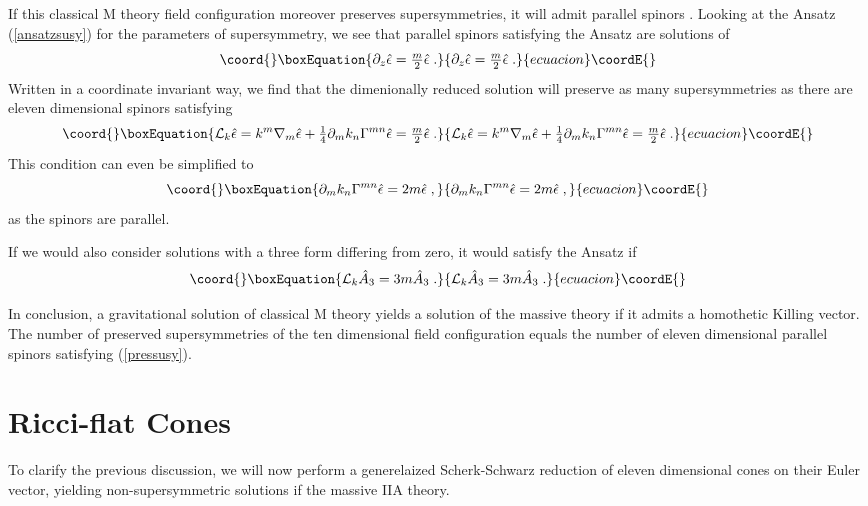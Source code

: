 \documentclass[a4paper,12pt]{article}
\providecommand{\ft}[2]{{\textstyle\frac{#1}{#2}}}
\begin{document}
If this classical M theory field configuration moreover preserves \coordHE{} supersymmetries, it will admit \coordHE{} parallel spinors \myHighlight{$\hat{\epsilon}$}\coordHE{}. Looking at the Ansatz (\ref{ansatzsusy}) for the parameters of supersymmetry, we see that parallel spinors satisfying the Ansatz are solutions of
\begin{equation}\coord{}\boxEquation{
\partial_z \hat{\epsilon}=\ft m2 \hat{\epsilon}\; .
}{
\partial_z \hat{\epsilon}=\ft m2 \hat{\epsilon}\; .
}{ecuacion}\coordE{}\end{equation}
Written in a coordinate invariant way, we find that the dimenionally reduced solution will preserve as many supersymmetries as there are eleven dimensional spinors satisfying
\begin{equation}\coord{}\boxEquation{
\mathcal{L}_k \hat{\epsilon}=k^m \nabla_m \hat{\epsilon}+\ft14 \partial_m k_n \Gamma^{mn} \hat{\epsilon}=\ft m2 \hat{\epsilon} \; .
}{
\mathcal{L}_k \hat{\epsilon}=k^m \nabla_m \hat{\epsilon}+\ft14 \partial_m k_n \Gamma^{mn} \hat{\epsilon}=\ft m2 \hat{\epsilon} \; .
}{ecuacion}\coordE{}\end{equation}
This condition can even be simplified to
\begin{equation}\coord{}\boxEquation{\label{pressusy}
\partial_m k_n \Gamma^{mn} \hat{\epsilon}=2m \hat{\epsilon}\; ,
}{\partial_m k_n \Gamma^{mn} \hat{\epsilon}=2m \hat{\epsilon}\; ,
}{ecuacion}\coordE{}\end{equation} 
as the spinors are parallel.

If we would also consider solutions with a three form differing from zero, it would satisfy the Ansatz if
\begin{equation}\coord{}\boxEquation{
\mathcal{L}_{k} \hat{A}_3=3m\hat{A}_3 \; .
}{
\mathcal{L}_{k} \hat{A}_3=3m\hat{A}_3 \; .
}{ecuacion}\coordE{}\end{equation}

In conclusion, a gravitational solution of classical M theory yields a solution of the massive theory if it admits a homothetic Killing vector. The number of preserved supersymmetries of the ten dimensional field configuration equals the number of eleven dimensional parallel spinors satisfying (\ref{pressusy}).
\section{Ricci-flat Cones}\label{ricciflat}
To clarify the previous discussion, we will now perform a generelaized Scherk-Schwarz reduction of eleven dimensional cones on their Euler vector, yielding non-supersymmetric solutions if the massive IIA theory.
\end{document}
